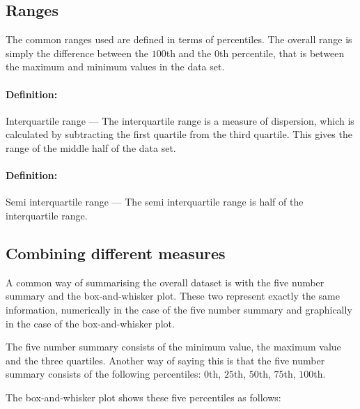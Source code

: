 \documentclass[a4paper,11pt]{report}
\def\Definition#1#2{\paragraph{Definition:} #1 --- #2}
\begin{document}
\subsection{Ranges}
The common ranges used are defined in terms of percentiles. The
overall range is simply the difference between the $100$th and the
$0$th percentile, that is between the maximum and minimum values in
the data set.

\Definition{Interquartile range}{The interquartile range is a
  measure of dispersion, which is calculated by subtracting the first
  quartile from the third quartile. This gives the range of the middle
  half of the data set.}

\Definition{Semi interquartile range}{The semi interquartile range is
  half of the interquartile range.}

\subsection{Combining different measures}
A common way of summarising the overall dataset is with the five
number summary and the box-and-whisker plot. These two represent
exactly the same information, numerically in the case of the five
number summary and graphically in the case of the box-and-whisker
plot.

The five number summary consists of the minimum value, the maximum
value and the three quartiles. Another way of saying this is that the
five number summary consists of the following percentiles: $0$th,
$25$th, $50$th, $75$th, $100$th.

The box-and-whisker plot shows these five percentiles as follows:

\begin{center}
\end{center}
\end{document}
